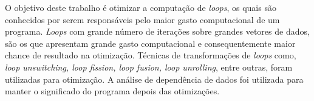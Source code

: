 \begin{resumo}
O objetivo deste trabalho é otimizar a computação de \textit{loops}, os quais 
são conhecidos por serem responsáveis pelo maior gasto computacional de um 
programa. 
\textit{Loops} com grande número de iterações sobre grandes vetores de dados,
são os que apresentam grande gasto computacional e consequentemente maior chance
de resultado na otimização.
Técnicas de transformações de \textit{loops} como, \textit{loop unswitching, 
loop fission, loop fusion, loop unrolling}, entre outras, foram utilizadas para 
otimização.
A análise de dependência de dados foi utilizada para manter o significado do 
programa depois das otimizações.
\end{resumo}
